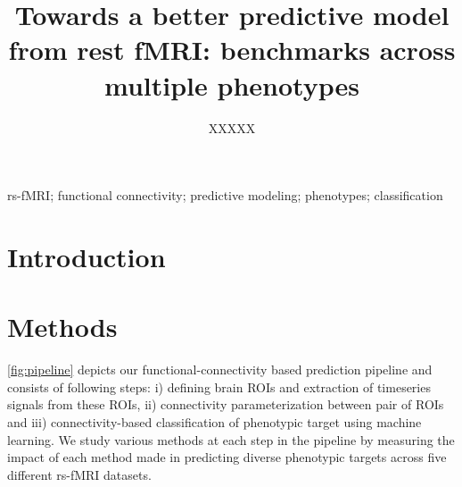 \documentclass[5p]{elsarticle}
\begin{document}

\title{Towards a better predictive model from rest fMRI: benchmarks across
multiple phenotypes}


\author[parietal,cea]{XXXXX}


\address[parietal]{Parietal project-team, INRIA Saclay-\^ile de France,
France}
\address[cea]{CEA/Neurospin b\^at 145, 91191 Gif-Sur-Yvette, France}


\begin{abstract}
%
%
\end{abstract}

\begin{keyword}
    rs-fMRI; functional connectivity; predictive modeling; phenotypes;
    classification
\end{keyword}

\maketitle%

\vspace*{-3em}%

\sloppy %

\section{Introduction}%


\section{Methods}

\autoref{fig:pipeline}  depicts  our  functional-connectivity based
prediction  pipeline \citep{abraham2017deriving} and consists of
following steps: i) defining brain ROIs and extraction of timeseries
signals from these ROIs,
ii) connectivity parameterization between pair of ROIs and
iii) connectivity-based classification of phenotypic target using
machine learning.
We study various methods at each
step in the pipeline by measuring the impact of each method
made in predicting diverse phenotypic targets across five different
rs-fMRI datasets.
\end{document}
